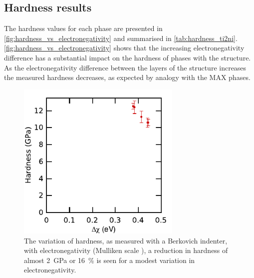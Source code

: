 \FloatBarrier
\subsection{Hardness results}
\FloatBarrier


The hardness values for each phase are presented in \autoref{fig:hardness_vs_electronegativity} and summarised in \autoref{tab:hardness_ti2ni}. \autoref{fig:hardness_vs_electronegativity} shows that the increasing electronegativity difference has a substantial impact on the hardness of phases with the  structure. As the electronegativity difference between the layers of the  structure increases the measured hardness decreases, as expected by analogy with the MAX phases. 


\begin{figure}
\centering
\captionsetup{width=0.7\textwidth}
\includegraphics[width=0.7\textwidth]{dX_vs_hardness_Ti2Ni}
\caption[The variation of hardness with electronegativity difference in the  structure.]{The variation of hardness, as measured with a Berkovich indenter, with electronegativity (Mulliken scale \cite{Mulliken1934}), a reduction in hardness of almost \SI{2}{\giga\pascal} or \SI{16}{\percent} is seen for a modest variation in electronegativity.\label{fig:hardness_vs_electronegativity}}
\end{figure}

